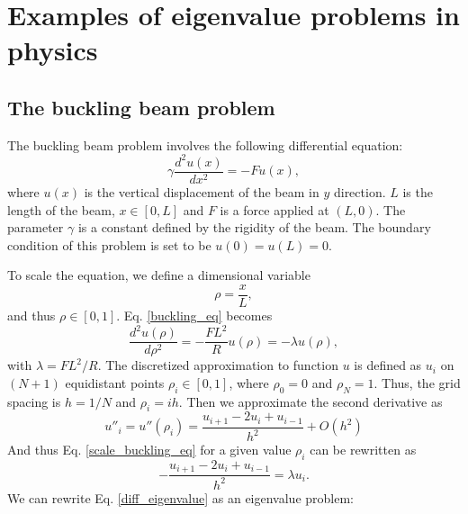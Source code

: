 \documentclass{article}
\begin{document}
	\section{Examples of eigenvalue problems in physics}\label{physcis_problem}
	\subsection{The buckling beam problem}\label{buckling_sec}
The buckling beam problem involves the following differential equation: 
\begin{equation}
\label{buckling_eq}
\gamma \frac{d^2 u(x)}{dx^2} = -F u(x),
\end{equation}
where $u(x)$ is the vertical displacement of the beam in $y$ direction. 
$L$ is the length of the beam, $x\in [0,L]$ and $F$ is a force applied at $(L,0)$. 
The parameter $\gamma$ is a constant defined by the rigidity of the beam. 
The boundary condition of this problem is set to be $u(0)=u(L)=0$. 
\par
To scale the equation, we define a dimensional variable
\[
\rho = \frac{x}{L}, 
\]
and thus $\rho \in [0,1]$. 
Eq. \ref{buckling_eq} becomes 
\begin{equation}\label{scale_buckling_eq}
\frac{d^2 u(\rho)}{d\rho^2} = -\frac{FL^2}{R} u(\rho)=-\lambda u(\rho),
\end{equation}
with $\lambda= FL^2/R$.
The discretized approximation to function $u$ is defined as $u_i$ 
on $(N+1)$ equidistant points $\rho_i \in [0,1]$, 
where $\rho_0=0$ and $\rho_N=1$. Thus, the grid spacing is $h=1/N$ and $\rho_i=ih$. 
Then we approximate the second derivative as 
\begin{equation}
u''_i=u''(\rho_i)=\frac{u_{i+1} -2u_i +u_{i-1}}{h^2} +O(h^2)
\label{eq:diffoperation}
\end{equation}
And thus Eq. \ref{scale_buckling_eq} for a given value $\rho_i$ can be rewritten as 
\begin{equation}\label{diff_eigenvalue}
-\frac{u_{i+1} -2u_i +u_{i-1} }{h^2}  = \lambda u_i.
\end{equation}
We can rewrite Eq. \ref{diff_eigenvalue} as an eigenvalue problem: 
\end{document}
